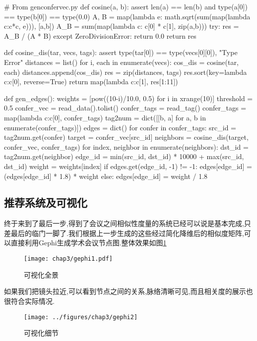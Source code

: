 \begin{python}
# From genconfervec.py
def cosine(a, b):
    assert len(a) == len(b) and type(a[0]) == type(b[0]) == type(0.0)
    A, B = map(lambda e: math.sqrt(sum(map(lambda c:c*c, e))), [a,b])
    A_B = sum(map(lambda c: c[0] * c[1], zip(a,b)))
    try:
        res = A_B / (A * B)
    except ZeroDivisionError:
        return 0.0
    return res

def cosine_dis(tar, vecs, tags):
    assert  type(tar[0]) == type(vecs[0][0]), "Type Error"
    distances = list()
    for i, each in enumerate(vecs):
        cos_dis = cosine(tar, each)
        distances.append(cos_dis)
    res = zip(distances, tags)
    res.sort(key=lambda c:c[0], reverse=True)
    return map(lambda c:c[1], res[1:11])

def gen_edges():
    weights = [pow((10-i)/10.0, 0.5) for i in xrange(10)]    
    threshold = 0.5
    confer_vec = read_data().tolist()
    confer_tags = read_tag()    
    confer_tags = map(lambda c:c[0], confer_tags)    
    tag2num = dict([[b, a] for a, b in enumerate(confer_tags)])
    edges = dict()    
    for confer in confer_tags:
        src_id = tag2num.get(confer)
        target = confer_vec[src_id]
        neighbors = cosine_dis(target, confer_vec, confer_tags)        
        for index, neighbor in enumerate(neighbors):
            dst_id = tag2num.get(neighbor)
            edge_id = min(src_id, dst_id) * 10000 + max(src_id, dst_id)
            weight = weights[index]
            if edges.get(edge_id, -1) != -1:
                edges[edge_id] = (edges[edge_id] * 1.8) *  weight
            else:
                edges[edge_id] = weight / 1.8
\end{python}

\subsection{推荐系统及可视化}

终于来到了最后一步,得到了会议之间相似性度量的系统已经可以说是基本完成,只差最后的临门一脚了.我们根据上一步生成的这些经过简化降维后的相似度矩阵,可以直接利用Gephi生成学术会议节点图.整体效果如图\ref{fig:gephi1}

\begin{figure}
\centering
\texttt{[image: chap3/gephi1.pdf]}
\caption{可视化全景}
\label{fig:gephi1}
\end{figure}

如果我们把镜头拉近,可以看到节点之间的关系,脉络清晰可见,而且相关度的展示也很符合实际情况.
\begin{figure}
\centering
\texttt{[image: ../figures/chap3/gephi2]}
\caption{可视化细节}
\label{fig:gephi2}
\end{figure}

